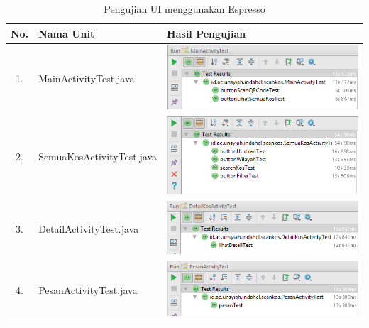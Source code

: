 		\begin{longtable}{ |c|p{5cm}|p{7cm}| }
			\caption{Pengujian UI menggunakan Espresso}
			\label{ujiAndroid} \\
			\hline
			No. &Nama Unit&Hasil Pengujian \\ \hline
			1. &MainActivityTest.java& 
			\begin{minipage}{7cm}
				\smallskip
				\includegraphics[scale=0.6]{gambar/testingAndroid/mainAct}
				\smallskip
			\end{minipage}
			 \\ \hline
			 
			 2. &SemuaKosActivityTest.java& 
			 \begin{minipage}{7cm}
			 	\smallskip
			 	\includegraphics[scale=0.6]{gambar/testingAndroid/semuaAct}
			 	\smallskip
			 \end{minipage}
			 \\ \hline
			 
			 3. &DetailActivityTest.java& 
			 \begin{minipage}{7cm}
			 	\smallskip
			 	\includegraphics[scale=0.6]{gambar/testingAndroid/detailAct}
			 	\smallskip
			 \end{minipage}
			 \\ \hline
			 
			 4. &PesanActivityTest.java& 
			 \begin{minipage}{7cm}
			 	\smallskip
			 	\includegraphics[scale=0.6]{gambar/testingAndroid/pesanAct}
			 	\smallskip
			 \end{minipage}
			 \\ \hline
			 

\end{longtable}

